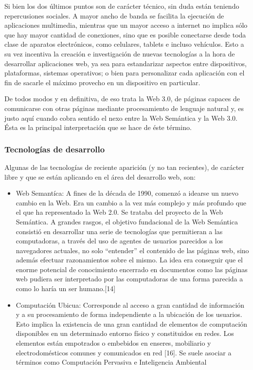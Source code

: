 Si bien los dos últimos puntos son de carácter técnico, sin duda están teniendo repercusiones sociales. A mayor ancho de banda se facilita
la ejecución de aplicaciones multimedia, mientras que un mayor acceso a internet no implica sólo que hay mayor cantidad de conexiones,
sino que es posible conectarse desde toda clase de aparatos electrónicos, como celulares, tablets e incluso vehículos. Esto a su
vez incentiva la creación e investigación de nuevas tecnologías a la hora de desarrollar aplicaciones web, ya sea para estandarizar
aspectos entre dispositivos, plataformas, sistemas operativos; o bien para personalizar cada aplicación con el fin de sacarle el máximo
provecho en un dispositivo en particular.

De todos modos y en definitiva, de eso trata la Web 3.0, de páginas capaces de comunicarse con otras páginas mediante procesamiento 
de lenguaje natural y, es justo aquí cuando cobra sentido el nexo entre la Web Semántica y la Web 3.0. Ésta es la principal interpretación
que se hace de éste término. 

\subsubsection{Tecnologías de desarrollo}
Algunas de las tecnologías de reciente aparición (y no tan recientes), de carácter libre y que se están aplicando en el 
área del desarrollo web, son:
\begin{itemize}
 \item Web Semantíca: A fines de la década de 1990, comenzó a idearse un nuevo cambio en la Web. Era un cambio a la vez más complejo y 
  más profundo que el que ha representado la Web 2.0. Se trataba del proyecto de la Web Semántica. 
  A grandes rasgos, el objetivo fundacional de la Web Semántica consistió en desarrollar una serie de tecnologías que permitieran a las
  computadoras, a través del uso de agentes de usuarios parecidos a los navegadores actuales, no solo “entender” el contenido de las 
  páginas web, sino además efectuar razonamientos sobre el mismo. La idea era conseguir que el enorme potencial de conocimiento
  encerrado en documentos como las páginas web pudiera ser interpretado por las computadoras de una forma parecida a como lo haría 
  un ser humano.[14]
 \item Computación Ubicua: Corresponde al acceso a gran cantidad de información y a su procesamiento de forma independiente a 
 la ubicación de los usuarios. Esto implica la existencia de una gran cantidad de elementos de computación disponibles en un determinado 
 entorno físico y constituidos en redes. Los elementos están empotrados o embebidos en enseres, mobiliario y electrodomésticos comunes y 
 comunicados en red [16]. Se suele asociar a términos como Computación Pervasiva e Inteligencia Ambiental

\end{itemize}



